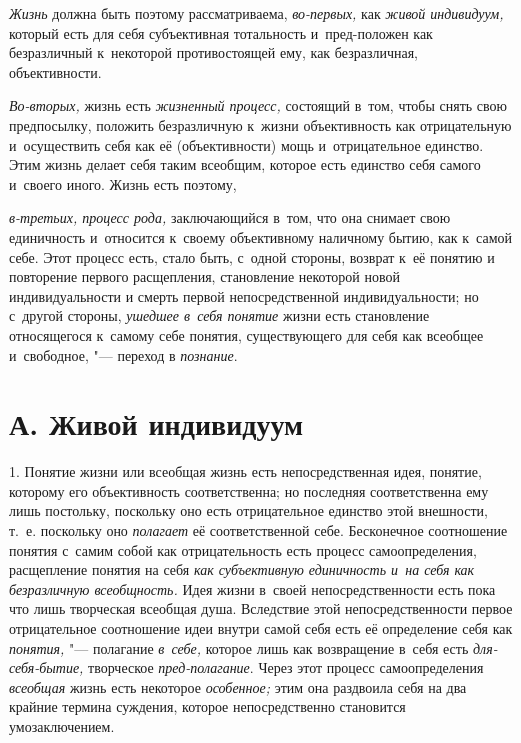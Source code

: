 {\em Жизнь} должна быть поэтому рассматриваема, {\em во-первых,} как {\em живой
индивидуум,} который есть для себя субъективная тотальность и~пред-положен как
безразличный к~некоторой противостоящей ему, как безразличная, объективности.

{\em Во-вторых,} жизнь есть {\em жизненный процесс,} состоящий в~том, чтобы
снять свою предпосылку, положить безразличную к~жизни объективность как
отрицательную и~осуществить себя как её (объективности) мощь и~отрицательное
единство. Этим жизнь делает себя таким всеобщим, которое есть единство себя
самого и~своего иного. Жизнь есть поэтому,

{\em в-третьих, процесс рода,} заключающийся в~том, что она снимает свою
единичность и~относится к~своему объективному наличному бытию, как к~самой
себе. Этот процесс есть, стало быть, с~одной стороны, возврат к~её понятию и
повторение первого расщепления, становление некоторой новой индивидуальности и
смерть первой непосредственной индивидуальности; но с~другой стороны,
{\em ушедшее в~себя понятие} жизни есть становление относящегося к~самому себе
понятия, существующего для себя как всеобщее и~свободное, "--- переход
в {\em познание}.

\section[А. Живой индивидуум]{А. Живой индивидуум}

1. Понятие жизни или всеобщая жизнь есть непосредственная
идея, понятие, которому его объективность соответственна; но последняя
соответственна ему лишь постольку, поскольку оно есть отрицательное
единство этой внешности, т.~е. поскольку оно
{\em полагает} её
соответственной себе. Бесконечное соотношение понятия с~самим собой как
отрицательность есть процесс самоопределения, расщепление понятия на себя
{\em как субъективную единичность и~на
себя как безразличную всеобщность.} Идея жизни в~своей
непосредственности есть пока что лишь творческая всеобщая душа. Вследствие
этой непосредственности первое отрицательное соотношение идеи внутри самой
себя есть её определение себя как {\em понятия,} "--- полагание
{\em в~себе,} которое лишь как возвращение в~себя есть {\em для-себя-бытие,}
творческое {\em пред-полагание}. Через этот процесс самоопределения
{\em всеобщая} жизнь есть некоторое {\em особенное;}
этим она раздвоила себя на два крайние термина суждения,
которое непосредственно становится умозаключением.

